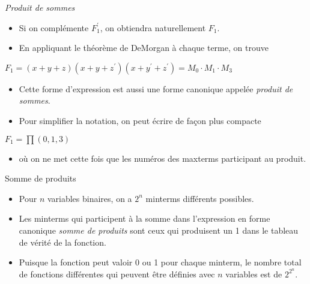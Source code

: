 \documentclass[presentation]{beamer}
\begin{document}
\begin{frame}[label={sec:org622f1ae}]{\emph{Produit de sommes}}
\begin{itemize}
\item Si on complémente \(F_1^\prime\), on obtiendra naturellement \(F_1\).

\item En appliquant le théorème de DeMorgan à chaque terme, on trouve
\end{itemize}

\(F_1 = (x+ y+ z)(x + y + z^\prime)(x + y^\prime + z^\prime) = M_0
\cdot M_1 \cdot M_3\)

\begin{itemize}
\item Cette forme d'expression est aussi une forme canonique appelée \emph{produit de sommes}.

\item Pour simplifier la notation, on peut écrire de façon plus compacte
\end{itemize}

\(F_1 = \prod (0,1,3)\)

\begin{itemize}
\item où on ne met cette fois que les numéros des maxterms participant au produit.
\end{itemize}
\end{frame}

\begin{frame}[label={sec:org2689bd5}]{Somme de produits}
\begin{itemize}
\item Pour \(n\) variables binaires, on a \(2^n\) minterms différents possibles.

\item Les minterms qui participent à la somme dans l'expression en forme canonique \emph{somme de produits} sont ceux qui produisent un 1 dans le tableau de vérité de la fonction.

\item Puisque la fonction peut valoir 0 ou 1 pour chaque minterm, le nombre total de fonctions différentes qui peuvent être définies avec \(n\) variables est de \(2^{2^n}\).
\end{itemize}
\end{frame}
\end{document}
